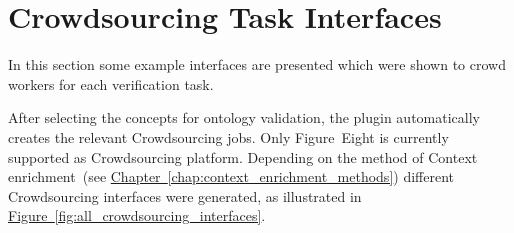 \section{Crowdsourcing Task Interfaces}\label{sec:crowdsourcing_task_interfaces}
In this section some example interfaces are presented which were shown to crowd workers for each verification task. 

After selecting the concepts for ontology validation, the plugin automatically creates the relevant Crowdsourcing jobs. Only Figure~Eight is currently supported as Crowdsourcing platform. Depending on the method of Context enrichment~(see \hyperref[chap:context_enrichment_methods]{Chapter~\ref*{chap:context_enrichment_methods}}) different Crowdsourcing interfaces were generated, as illustrated in \hyperref[fig:all_crowdsourcing_interfaces]{Figure~\ref*{fig:all_crowdsourcing_interfaces}}. 

